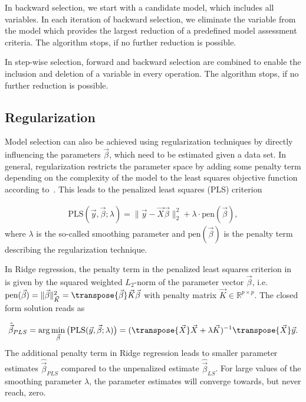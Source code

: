 In backward selection, we start with a candidate model, which includes all variables. In each iteration of backward selection, we eliminate the variable from the model which provides the largest reduction of a predefined model assessment criteria. The algorithm stops, if no further reduction is possible. 

In step-wise selection, forward and backward selection are combined to enable the inclusion and deletion of a variable in every operation. The algorithm stops, if no further reduction is possible.

\subsection{Regularization} \label{subsec:Regularization}

Model selection can also be achieved using regularization techniques by directly influencing the parameters $\vec{\beta}$, which need to be estimated given a data set. In general, regularization restricts the parameter space by adding some penalty term depending on the complexity of the model to the least squares objective function according to~. This leads to the penalized least squares (PLS) criterion

\begin{align} \label{eq:PLS_crit}
	\text{PLS}(\vec{y}, \vec{\beta}; \lambda) = \lVert \vec{y} - \vec{X} \vec{\beta}\rVert^2_2 + \lambda \cdot \text{pen}(\vec{\beta}),
\end{align}
%
where $\lambda$ is the so-called smoothing parameter and $\text{pen}(\vec{\beta})$ is the penalty term describing the regularization technique. 

In Ridge regression, the penalty term in the penalized least squares criterion in~ is given by the squared weighted $L_2$-norm of the parameter vector $\vec{\beta}$, i.e. $\text{pen}(\vec{\beta}) = \lVert \vec{\beta} \rVert^2_{\vec{K}} = \transpose{\vec{\beta}} \vec{K} \vec{\beta}$ with penalty matrix $\vec{K} \in \mathbb{R}^{p \times p}$. The closed form solution reads as

\begin{align}
	\hat{\vec{\beta}}_{PLS} = \arg \min_{\vec{\beta}} \big(\text{PLS}(\vec{y}, \vec{\beta}; \lambda) \big) = (\transpose{\vec{X}} \vec{X} + \lambda \vec{K})^{-1} \transpose{\vec{X}}\vec{y}.
\end{align}
%
The additional penalty term in Ridge regression leads to smaller parameter estimates $\hat{\vec{\beta}}_{PLS}$ compared to the unpenalized estimate $\hat{\vec{\beta}}_{LS}$. For large values of the smoothing parameter $\lambda$, the parameter estimates will converge towards, but never reach, zero. 

